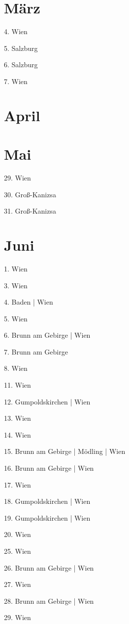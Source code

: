 \documentclass[twoside=false,titlepage=false,open=any, parskip=never, fontsize=10pt, headings=small, chapterprefix=false, appendixprefix=false, DIV=15]{scrbook}
\begin{document}
\begin{multicols}{3}
            \section*{März}
            4. Wien\par
            5. Salzburg\par
            6. Salzburg\par
            7. Wien\par
            \section*{April}
            \section*{Mai}
            29. Wien\par
            30. Groß-Kanizsa\par
            31. Groß-Kanizsa\par
            \section*{Juni}
            1. Wien\par
            3. Wien\par
            4. Baden | Wien\par
            5. Wien\par
            6. Brunn am Gebirge | Wien\par
            7. Brunn am Gebirge\par
            8. Wien\par
            11. Wien\par
            12. Gumpoldskirchen | Wien\par
            13. Wien\par
            14. Wien\par
            15. Brunn am Gebirge | Mödling | Wien\par
            16. Brunn am Gebirge | Wien\par
            17. Wien\par
            18. Gumpoldskirchen | Wien\par
            19. Gumpoldskirchen | Wien\par
            20. Wien\par
            25. Wien\par
            26. Brunn am Gebirge | Wien\par
            27. Wien\par
            28. Brunn am Gebirge | Wien\par
            29. Wien\par

\end{multicols}
\end{document}
